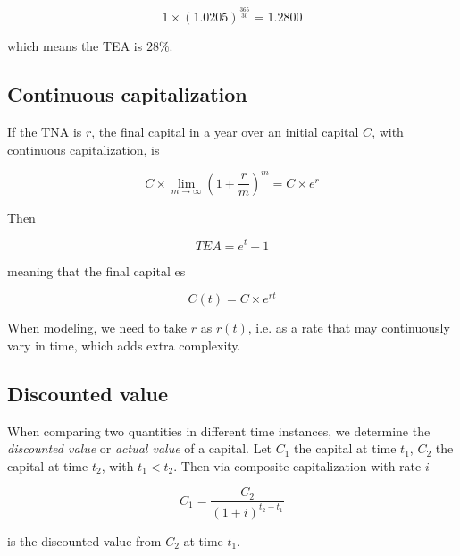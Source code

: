 \documentclass[a4paper, 12pt]{article}
\theoremstyle{definition}
\begin{document}
\begin{equation*}
    1 \times (1.0205)^{\frac{365}{30}} = 1.2800
\end{equation*}

which means the TEA is $28\%$.

\subsection{Continuous capitalization}

If the TNA is $r$, the final capital in a year over an initial capital $C$, with
continuous capitalization, is 

\begin{equation*}
    C \times \lim_{m \to \infty}\left( 1 + \frac{r}{m} \right)^m = C \times e^r
\end{equation*}

Then 

\begin{equation*}
    TEA = e^t - 1
\end{equation*}

meaning that the final capital es 

\begin{equation*}
    C(t) = C \times e^{rt}
\end{equation*}

When modeling, we need to take $r$ as $r(t)$, i.e. as a rate that may
continuously vary in time, which adds extra complexity.

\subsection{Discounted value}

When comparing two quantities in different time instances, we determine the 
\textit{discounted value} or \textit{actual value} of a capital. Let $C_1$ the
capital at time $t_1$, $C_2$ the capital at time $t_2$, with $t_1 < t_2$.
Then via composite capitalization with rate $i$ 

\begin{equation*}
    C_{1} = \frac{C_2}{(1+i)^{t_2 - t_1}}
\end{equation*}

is the discounted value from $C_2$ at time $t_1$.
\end{document}
